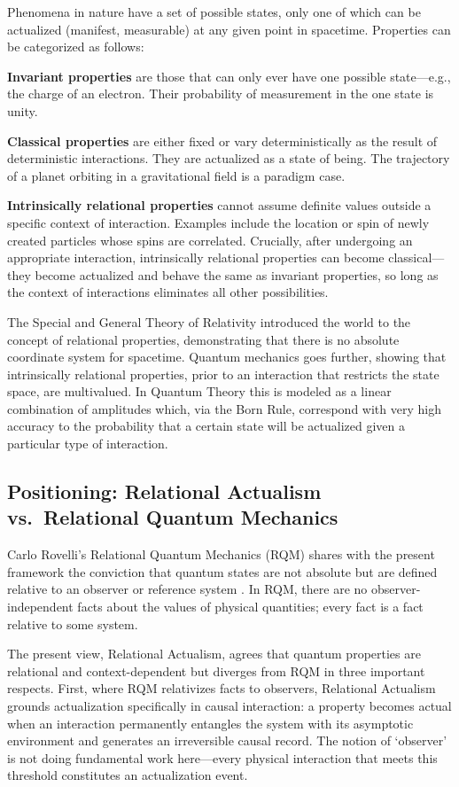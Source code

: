 \documentclass[11pt,a4paper]{article}
\theoremstyle{plain}
\theoremstyle{definition}
\theoremstyle{remark}
\begin{document}
Phenomena in nature have a set of possible states, only one of which can be
actualized (manifest, measurable) at any given point in spacetime. Properties can
be categorized as follows:

\textbf{Invariant properties} are those that can only ever have one possible
state---e.g., the charge of an electron. Their probability of measurement in the
one state is unity.

\textbf{Classical properties} are either fixed or vary deterministically as the
result of deterministic interactions. They are actualized as a state of being. The
trajectory of a planet orbiting in a gravitational field is a paradigm case.

\textbf{Intrinsically relational properties} cannot assume definite values outside
a specific context of interaction. Examples include the location or spin of newly
created particles whose spins are correlated. Crucially, after undergoing an
appropriate interaction, intrinsically relational properties can become
classical---they become actualized and behave the same as invariant properties, so
long as the context of interactions eliminates all other possibilities.

The Special and General Theory of Relativity introduced the world to the concept
of relational properties, demonstrating that there is no absolute coordinate
system for spacetime. Quantum mechanics goes further, showing that intrinsically
relational properties, prior to an interaction that restricts the state space, are
multivalued. In Quantum Theory this is modeled as a linear combination of
amplitudes which, via the Born Rule, correspond with very high accuracy to the
probability that a certain state will be actualized given a particular type of
interaction.

\subsection{Positioning: Relational Actualism vs.\ Relational Quantum Mechanics}

Carlo Rovelli's Relational Quantum Mechanics (RQM) shares with the present
framework the conviction that quantum states are not absolute but are defined
relative to an observer or reference system \citep{Rovelli1996}. In RQM, there
are no observer-independent facts about the values of physical quantities; every
fact is a fact relative to some system.

The present view, Relational Actualism, agrees that quantum properties are
relational and context-dependent but diverges from RQM in three important
respects. First, where RQM relativizes facts to observers, Relational Actualism
grounds actualization specifically in causal interaction: a property becomes actual
when an interaction permanently entangles the system with its asymptotic
environment and generates an irreversible causal record. The notion of `observer'
is not doing fundamental work here---every physical interaction that meets this
threshold constitutes an actualization event.
\end{document}
